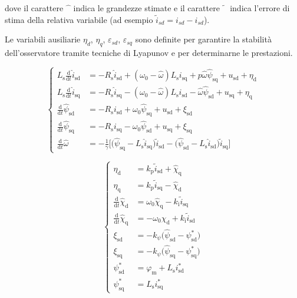 \documentclass[11pt, a4paper]{scrartcl}
\begin{document}
\noindent
dove il carattere $\hat{\phantom{x}}$ indica le grandezze stimate e il carattere
$\tilde{\phantom{x}}$ indica l'errore di stima della relativa variabile
(ad esempio $\tilde{i}_{sd} = i_{sd} - \hat{i}_{sd}$).

\bigskip
\noindent
Le variabili ausiliarie $\eta_d$, $\eta_q$, $\varepsilon_{sd}$, $\varepsilon_{sq}$
sono definite per garantire la stabilità dell'osservatore tramite tecniche di Lyapunov
e per determinarne le prestazioni.

\begin{equation}
	\label{nlobs_pu_1}\left\lbrace 
	\begin{aligned}
		L_\text{s} \frac{\text{d}}{\text{d}t}\hat{i}_\text{sd} &= -R_\text{s} \hat{i}_\text{sd}+\left( \omega_0-\hat{\omega}\right)L_\text{s}i_\text{sq} + 
		p \hat{\omega}\hat{\psi}_\text{sq}+u_\text{sd}+\eta_\text{d} \\[6pt]
		L_\text{s} \frac{\text{d}}{\text{d}t}\hat{i}_\text{sq} &= -R_\text{s} \hat{i}_\text{sq}-\left( \omega_0-\hat{\omega}\right)L_\text{s}i_\text{sd} - 
		\hat{\omega}\hat{\psi}_\text{sd}+u_\text{sq}+\eta_\text{q} \\[6pt]	
		\frac{\text{d}}{\text{d}t}\hat{\psi}_\text{sd} &= -R_\text{s} i_\text{sd} + \omega_0\hat{\psi}_\text{sq} + u_\text{sd} + \xi_\text{sd}  \\[6pt]
		\frac{\text{d}}{\text{d}t}\hat{\psi}_\text{sq} &= -R_\text{s} i_\text{sq} - \omega_0\hat{\psi}_\text{sd} + u_\text{sq} + \xi_\text{sq}  \\[6pt]
		\frac{\text{d}}{\text{d}t}\hat{\omega} &= -\frac{1}{\gamma}\big[\big(\hat{\psi}_\text{sq} -L_\text{s}\hat{i}_\text{sq}\big)\tilde{i}_\text{sd} - \big(\hat{\psi}_\text{sd} -L_\text{s}\hat{i}_\text{sd}\big)\tilde{i}_\text{sq}\big]
	\end{aligned}\right. 
\end{equation}

\begin{equation}
	\label{nlobs_pu_1}\left\lbrace 
	\begin{aligned}
		\eta_\text{d} &= k_\text{p}\tilde{i}_\text{sd} + \hat{\chi}_\text{q} \\[6pt]
		\eta_\text{q} &= k_\text{p}\tilde{i}_\text{sq} - \hat{\chi}_\text{d} \\[6pt]
		\frac{\text{d}}{\text{d}t}\hat{\chi}_\text{d} &= \omega_0\hat{\chi}_\text{q} - 	k_\text{i}\tilde{i}_\text{sq}  \\[6pt]
		\frac{\text{d}}{\text{d}t}\hat{\chi}_\text{q} &= -\omega_0\hat{\chi}_\text{d} + 	k_\text{i}\tilde{i}_\text{sd}  \\[6pt]	
		\xi_\text{sd} &= -k_{\psi}\big(\hat{\psi}_\text{sd} - \psi_\text{sd}^\text{*}\big) \\[6pt]
		\xi_\text{sq} &= -k_{\psi}\big(\hat{\psi}_\text{sq} - \psi_\text{sq}^\text{*}\big) \\[6pt]
		\psi_\text{sd}^\text{*} &= \varphi_\text{m} + L_\text{s}i_\text{sd}^\text{*} \\[6pt]
		\psi_\text{sq}^\text{*} &= L_\text{s}i_\text{sq}^\text{*}
	\end{aligned}\right. 
\end{equation}
\end{document}
